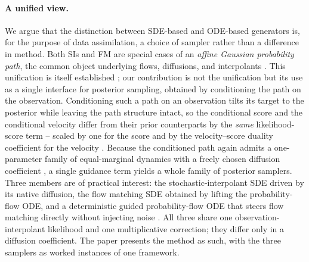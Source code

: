 \paragraph{A unified view.}
We argue that the distinction between SDE-based and ODE-based generators is, for the purpose of data assimilation, a choice of sampler rather than a difference in method. Both SIs and FM are special cases of an \emph{affine Gaussian probability path}, the common object underlying flows, diffusions, and interpolants \cite{albergo_stochastic_2023, lipman_flow_2023, ma_sit_2024, holderrieth_generator_2024}. This unification is itself established \cite{albergo_stochastic_2023, holderrieth_generator_2024}; our contribution is not the unification but its use as a single interface for posterior sampling, obtained by conditioning the path on the observation. Conditioning such a path on an observation tilts its target to the posterior while leaving the path structure intact, so the conditional score and the conditional velocity differ from their prior counterparts by the \emph{same} likelihood-score term -- scaled by one for the score and by the velocity--score duality coefficient for the velocity \cite{albergo_stochastic_2023, ma_sit_2024}. Because the conditioned path again admits a one-parameter family of equal-marginal dynamics with a freely chosen diffusion coefficient \cite{song_score-based_2021}, a single guidance term yields a whole family of posterior samplers. Three members are of practical interest: the stochastic-interpolant SDE driven by its native diffusion, the flow matching SDE obtained by lifting the probability-flow ODE, and a deterministic guided probability-flow ODE that steers flow matching directly without injecting noise \cite{yan_fig_2024, pokle_training-free_2024}. All three share one observation-interpolant likelihood and one multiplicative correction; they differ only in a diffusion coefficient. The paper presents the method as such, with the three samplers as worked instances of one framework.

